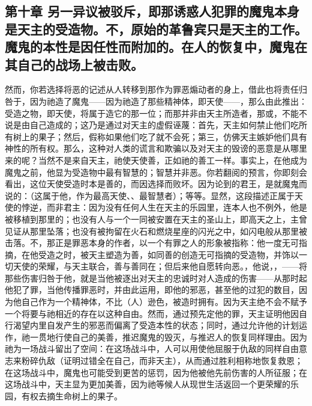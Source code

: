 
\subsection{第十章 另一异议被驳斥，即那诱惑人犯罪的魔鬼本身是天主的受造物。不，原始的革鲁宾只是天主的工作。魔鬼的本性是因任性而附加的。在人的恢复中，魔鬼在其自己的战场上被击败。}

然而，你若选择将恶的记述从人转移到那作为罪恶煽动者的身上，借此也将责任归咎于，因为祂造了魔鬼——因为祂造了那些精神体，即天使——，那么由此推出：受造之物，即天使，将属于造它的那一位；而那并非由天主所造者，那或，不能不说是由自己造成的；这乃是通过对天主的虚假诬蔑：首先，天主如何禁止他们吃所有树上的果子；然后，假称如果他们吃了就不会死；第三，仿佛天主嫉妒他们具有神性的所有权。那么，这种对人类的谎言和欺骗以及对天主的毁谤的恶意是从哪里来的呢？当然不是来自天主，祂使天使善，正如祂的善工一样。事实上，在他成为魔鬼之前，他显为受造物中最有智慧的；智慧并非恶。你若翻阅的预言，你即刻会看出，这位天使受造时本是善的，而因选择而败坏。因为论到的君王，是就魔鬼而说的：（这属于他，作为最高天使、、最智慧者）；等等。显然，这段描述正属于天使的悖逆，而非君主：因为没有任何人生在天主的乐园里，连本人也不例外，他是被移植到那里的；也没有人与一个一同被安置在天主的圣山上，即高天之上，主曾见证从那里坠落；也没有被拘留在火石和燃烧星座的闪光之中，如闪电般从那里被击落。不，那正是罪恶本身的作者，以一个有罪之人的形象被指称：他一度无可指摘，在他受造之时，被天主塑造为善，如同善的创造无可指摘的受造物，并饰以一切天使的荣耀，与天主联合，善与善同在；但后来他自愿转向恶。，他说，，——将那些伤害归咎于他，就是当他被逐出对天主的忠诚时对人造成的伤害——从那时起他犯了罪，当他传播罪恶时，并由此运用，即他的邪恶，甚至他的过犯的数目，因为他自己作为一个精神体，不比（人）逊色，被造时拥有。因为天主绝不会不赋予一个将要与祂相近的存在以这种自由。然而，通过预先定他的罪，天主证明他因自行渴望内里自发产生的邪恶而偏离了受造本性的状态；同时，通过允许他的计划运作，祂一贯地行使自己的美善，推迟魔鬼的毁灭，与推迟人的恢复同样理由。因为祂为一场战斗留出了空间：在这场战斗中，人可以用使他屈服于仇敌的同样自由意志来粉碎仇敌（证明过错全在自己，而非天主），从而通过胜利相称地恢复救恩；在这场战斗中，魔鬼也可能受到更苦的惩罚，因为他被他先前伤害的人所征服；在这场战斗中，天主显为更加美善，因为祂等候人从现世生活返回一个更荣耀的乐园，有权去摘生命树上的果子。\par

